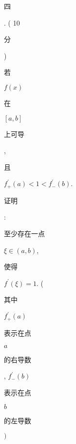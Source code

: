 \documentclass[10pt]{article}
\begin{document}
\begin{CJK}{UTF8}{mj}四\end{CJK}. ( 10 \begin{CJK}{UTF8}{mj}分\end{CJK}) \begin{CJK}{UTF8}{mj}若\end{CJK} $f(x)$ \begin{CJK}{UTF8}{mj}在\end{CJK} $[a, b]$ \begin{CJK}{UTF8}{mj}上可导\end{CJK}, \begin{CJK}{UTF8}{mj}且\end{CJK} $f_{+}^{\prime}(a)<1<f_{-}^{\prime}(b)$. \begin{CJK}{UTF8}{mj}证明\end{CJK}: \begin{CJK}{UTF8}{mj}至少存在一点\end{CJK} $\xi \in(a, b)$, \begin{CJK}{UTF8}{mj}使得\end{CJK} $f^{\prime}(\xi)=1$. (\begin{CJK}{UTF8}{mj}其中\end{CJK} $f_{+}^{\prime}(a)$ \begin{CJK}{UTF8}{mj}表示在点\end{CJK} $a$ \begin{CJK}{UTF8}{mj}的右导数\end{CJK}, $f_{-}^{\prime}(b)$ \begin{CJK}{UTF8}{mj}表示在点\end{CJK} $b$ \begin{CJK}{UTF8}{mj}的左导数\end{CJK} $)$
\end{document}
